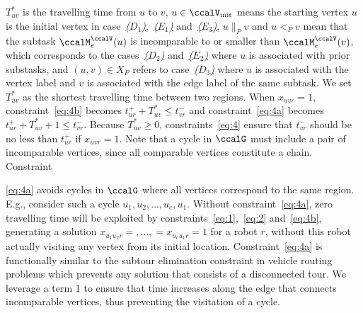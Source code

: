 \documentclass[Afour,sageh,times]{sagej}
\begin{document}
$T^*_{uv}$ is the travelling time from $u$ to $v$, $u \in \ccalV_{\text{init}}$ means the starting vertex $u$ is the initial vertex in case~\hyperref[sec:a]{{\it ($D_1$)}},~\hyperref[edge:vertex1]{{\it ($E_1$)}} and~\hyperref[edge:vertex3]{{\it ($E_3$)}}, $u \|_{P} v$ and $u<_{P} v$ mean that the subtask $\ccalM^\ccalV_{{e}}(u)$ is incomparable to or smaller than $\ccalM^\ccalV_e(v)$, which corresponds to the cases~\hyperref[sec:b]{{\it ($D_2$)}} and~\hyperref[edge:vertex2]{{\it ($E_2$)}} where $u$ is associated with prior substasks, and $(u,v)\in X_P$ refers to case~\hyperref[sec:c]{{\it ($D_3$)}} where $u$ is associated with the vertex label and $v$ is associated with the edge label of the same subtask. We set $T^*_{uv}$ as the shortest travelling time between two regions. When $x_{uvr}=1$, constraint~\eqref{eq:4b} becomes $t_{ur}^+  + T^*_{uv}  \leq t_{vr}^-$ and constraint~\eqref{eq:4a} becomes $t_{ur}^+  + T^*_{uv} + 1   \leq t_{vr}^-$. Because $T^*_{uv} \geq 0$, constraints~\eqref{eq:4} ensure that $t_{vr}^-$ should be no less than $t_{ur}^+$ if $x_{uvr}=1$. Note that a cycle in $\ccalG$ must include a pair of incomparable vertices, since all comparable vertices constitute a chain. Constraint~{\eqref{eq:4a} avoids cycles in $\ccalG$ where all vertices correspond to the same region. E.g., consider such a cycle $u_1,u_2,\ldots, u_c, u_1$. Without  constraint~\eqref{eq:4a}, zero travelling time will be exploited by constraints~\eqref{eq:1},~\eqref{eq:2} and~\eqref{eq:4b}, generating a solution $x_{u_1 u_2 r} = ,\ldots,=x_{u_c u_{1} r}= 1$ for a robot $r$, without this robot actually visiting any vertex from its initial location.  Constraint~\eqref{eq:4a} is functionally similar to the subtour elimination constraint in vehicle routing problems which prevents any solution that consists of a disconnected tour. We leverage a  term 1 to ensure that time increases along the edge that connects incomparable vertices, thus preventing the visitation of a cycle.

}
\end{document}
